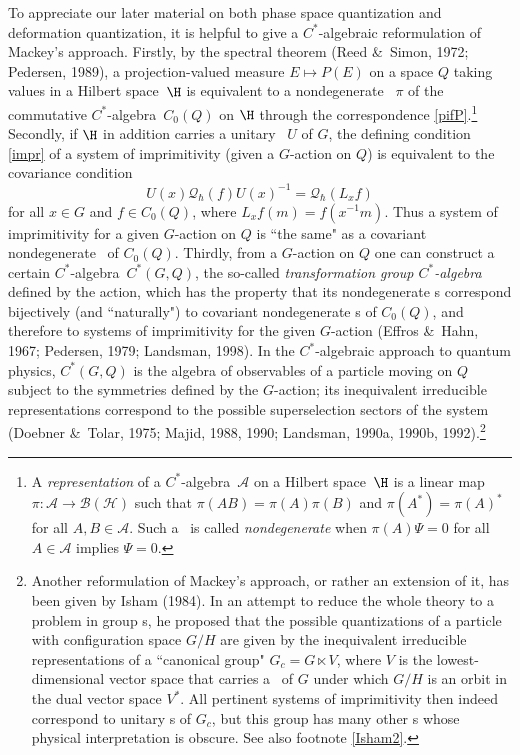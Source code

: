 \documentclass[12pt,titlepage]{article}
\newcommand{\beq}{\begin{equation}}
\newcommand{\eeq}{\end{equation}}
\newcommand{\ca}{$C^*$-algebra} \newcommand{\jba}{JB-algebra}
\newcommand{\irrep}{irreducible representation}
\newcommand{\Hs}{Hilbert space} \newcommand{\Bs}{Banach space}
\newcommand{\raw}{\rightarrow} \newcommand{\rat}{\mapsto}
\newcommand{\BH}{\mathcal{B}({\mathcal H})} \newcommand{\diri}{\int^{\oplus}}
\newcommand{\qh}{q_{\hbar}} \newcommand{\sgh}{\sigma_{\hbar}}
\newcommand{\inv}{^{-1}} \newcommand{\sa}{_{\R}}
\newcommand{\er}{\eqref}
\newcommand{\CA}{{\mathcal A}} \newcommand{\CB}{{\mathcal B}}
\newcommand{\CQ}{{\mathcal Q}} \newcommand{\CR}{{\mathcal R}}
\renewcommand{\qh}{\CQ_{\hbar}}
\begin{document}
To appreciate our later material on both  phase space quantization and deformation quantization, it is helpful to give a \ca ic reformulation of Mackey's approach. Firstly, by the spectral theorem (Reed \&\ Simon, 1972; Pedersen, 1989), a projection-valued measure $E\mapsto P(E)$ on a space $Q$ taking values in a \Hs\ $\H$ is equivalent to a nondegenerate \rep\ $\pi$ of the commutative \ca\ $C_0(Q)$ on $\H$ through the correspondence \er{pifP}.\footnote{A  {\it representation} of a \ca\ $\CA$ on a \Hs\ $\H$ is a linear map $\pi:\CA\raw\BH$ such that $\pi(AB)=\pi(A)\pi(B)$ and
$\pi(A^*)=\pi(A)^*$ for all $A,B\in\CA$. 
Such a  \rep\ is called {\it nondegenerate} when $\pi(A)\Psi =0$ for all $A\in\CA$ implies $\Psi=0$.} Secondly, if $\H$ in addition carries a unitary \rep\ $U$ of $G$, the defining condition \er{impr} of a system of imprimitivity (given a $G$-action on $Q$) is equivalent to the covariance condition \beq U(x)\qh(f)U(x)\inv=\qh(L_xf) \label{Gcov}\eeq
 for all $x\in G$ and $f\in C_0(Q)$, where $L_xf (m)=f(x\inv m)$.  Thus a  system of imprimitivity for a given $G$-action on $Q$ is ``the same" as a covariant nondegenerate \rep\ of $C_0(Q)$. Thirdly, from a $G$-action on $Q$ one can construct a certain \ca\ $C^*(G,Q)$, the so-called {\it transformation group \ca} defined by the action,
which has the property that its nondegenerate \rep s correspond bijectively (and ``naturally") to covariant nondegenerate \rep s of $C_0(Q)$, and therefore to systems of imprimitivity for the given $G$-action (Effros \&\  Hahn, 1967; Pedersen, 1979; Landsman, 1998).  In the \ca ic approach to quantum physics, $C^*(G,Q)$ is
the algebra of observables of a particle moving on $Q$ subject to the symmetries defined by the $G$-action; its inequivalent \irrep s correspond to the possible superselection sectors of the system (Doebner \&\  Tolar, 1975; Majid, 1988, 1990; Landsman, 1990a, 1990b, 1992).\footnote{Another reformulation of Mackey's approach, or rather an extension of it, has been given by Isham (1984). In an attempt to reduce the whole theory 
to a problem in group \rep s, he proposed that the possible quantizations of a particle 
with configuration space $G/H$ are given by the inequivalent \irrep s of a ``canonical group" $G_c=G\ltimes V$, where $V$ is the lowest-dimensional vector space that carries a \rep\ of $G$ under which $G/H$ is an orbit in the dual vector space  $V^*$. All pertinent systems of imprimitivity then indeed correspond to unitary \rep s of $G_c$, but this group has many other \rep s whose physical interpretation is obscure. See also footnote \ref{Isham2}.\label{Isham1}}
\end{document}
